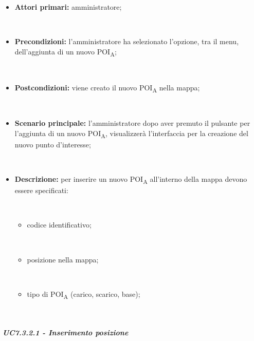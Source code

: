 \begin{itemize}

​    \item   \textbf{Attori primari:} amministratore;

​    \item   \textbf{Precondizioni:} l'amministratore ha selezionato l'opzione, tra il menu, dell'aggiunta di un nuovo POI\textsubscript{A};

​    \item   \textbf{Postcondizioni:} viene creato il nuovo POI\textsubscript{A} nella mappa;

​    \item   \textbf{Scenario principale:} l'amministratore dopo aver premuto il pulsante per l'aggiunta di un nuovo POI\textsubscript{A}, visualizzerà l'interfaccia per la creazione del nuovo punto d'interesse;

​    \item   \textbf{Descrizione:} per inserire un nuovo POI\textsubscript{A} all'interno della mappa devono essere specificati:

​    \begin{itemize}

​        \item codice identificativo;

​        \item posizione nella mappa;

​        \item tipo di POI\textsubscript{A} (carico, scarico, base);

​    \end{itemize}

\end{itemize}



\subparagraph{UC7.3.2.1 - Inserimento posizione}

